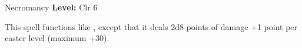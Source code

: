 {Necromancy}
{
	\textbf{Level:}
	Clr 6\\
}
{
	This spell functions like , except that it deals 2d8 points of damage +1 point per caster level (maximum +30).

}
